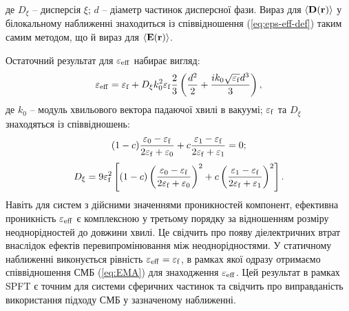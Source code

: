 \documentclass[14pt,twoside]{vakthesis}
\begin{document}
де $D_{\xi}$ -- дисперсія $\xi$; $d$ -- діаметр частинок дисперсної фази.
Вираз для $\langle {\bf D} ({\bf r}) \rangle$ у білокальному наближенні знаходиться із співвідношення (\ref{eq:eps-eff-def}) таким самим методом, що й вираз для $\langle {\bf E} ({\bf r}) \rangle$.

Остаточний результат для $\varepsilon_{\rm eff}$ \cite{Tsang1981} набирає вигляд:
\begin{equation}\label{eq:eps_eff-SPFT}
{\varepsilon}_{\rm eff} = {\varepsilon}_{\rm f} + D_{\xi} k_0^2 {\varepsilon}_{\rm f} \frac{2}{3} \left( \frac{d^2}{2} + \frac{ik_0 \sqrt{{\varepsilon}_{\rm f}} d^3}{3} \right),
\end{equation}
де $k_0$ -- модуль хвильового вектора падаючої хвилі в вакуумі; $\varepsilon_{\rm f}$ та $D_\xi$ знаходяться із  співвідношень:
\begin{eqnarray}\label{eq:Brug-SPFT}
(1-c)\frac{{\varepsilon}_0 - {\varepsilon}_{\rm f}}{2{\varepsilon}_{\rm f} + {\varepsilon}_0}
+c\frac{{\varepsilon}_1 - {\varepsilon}_{\rm f}}{2{\varepsilon}_{\rm f} + {\varepsilon}_1} = 0;
\end{eqnarray}
\begin{eqnarray}\label{eq:Dxi-SPFT}
D_{\xi} = 9 {\varepsilon}_{\rm f}^2 \left[ (1-c) \left(\frac{{\varepsilon}_0 - {\varepsilon}_{\rm f}}{2{\varepsilon}_{\rm f} + {\varepsilon}_0} \right)^2
+c \left(\frac{{\varepsilon}_1 - {\varepsilon}_{\rm f}}{2{\varepsilon}_{\rm f} + {\varepsilon}_1}\right)^2 \right].
\end{eqnarray}
Навіть для систем з дійсними значеннями проникностей компонент, ефективна проникність $\varepsilon_{\rm eff}$ є комплексною у третьому порядку за відношенням розміру неоднорідностей до довжини хвилі. Це свідчить про появу діелектричних втрат внаслідок  ефектів перевипромінювання між неоднорідностями.
У статичному наближенні  виконується рівність ${\varepsilon}_{\rm eff} = {\varepsilon}_{\rm f}$, в рамках якої одразу отримаємо співвідношення СМБ (\ref{eq:EMA}) для знаходження ${\varepsilon}_{\rm eff}$. Цей результат  в рамках SPFT є точним для системи сферичних частинок та свідчить про виправданість використання підходу СМБ у зазначеному наближенні.
\end{document}
